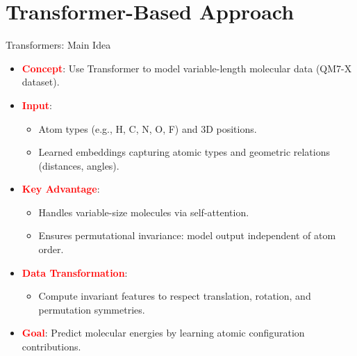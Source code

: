 \documentclass[10pt]{beamer}
\begin{document}
\section{Transformer-Based Approach}
\begin{frame}{Transformers: Main Idea}
  \begin{itemize}
    \item \textcolor{red}{\textbf{Concept}}: Use Transformer to model variable-length molecular data (QM7-X dataset).
    \item \textcolor{red}{\textbf{Input}}: 
      \begin{itemize}
        \item Atom types (e.g., H, C, N, O, F) and 3D positions.
        \item Learned embeddings capturing atomic types and geometric relations (distances, angles).
      \end{itemize}
    \item \textcolor{red}{\textbf{Key Advantage}}: 
      \begin{itemize}
        \item Handles variable-size molecules via self-attention.
        \item Ensures permutational invariance: model output independent of atom order.
      \end{itemize}
    \item \textcolor{red}{\textbf{Data Transformation}}: 
      \begin{itemize}
        \item Compute invariant features to respect translation, rotation, and permutation symmetries.
      \end{itemize}
    \item \textcolor{red}{\textbf{Goal}}: Predict molecular energies by learning atomic configuration contributions.
  \end{itemize}
\end{frame}
\end{document}
